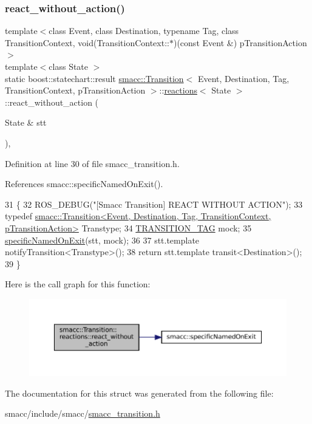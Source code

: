 \subsubsection{\texorpdfstring{react\+\_\+without\+\_\+action()}{react\_without\_action()}}
{\footnotesize\ttfamily template$<$class Event, class Destination, typename Tag, class Transition\+Context, void(\+Transition\+Context\+::$\ast$)(const Event \&) p\+Transition\+Action$>$ \\
template$<$class State $>$ \\
static boost\+::statechart\+::result \hyperlink{classsmacc_1_1Transition}{smacc\+::\+Transition}$<$ Event, Destination, Tag, Transition\+Context, p\+Transition\+Action $>$\+::\hyperlink{structsmacc_1_1Transition_1_1reactions}{reactions}$<$ State $>$\+::react\+\_\+without\+\_\+action (\begin{DoxyParamCaption}\item[{State \&}]{stt }\end{DoxyParamCaption})\hspace{0.3cm}{\ttfamily [inline]}, {\ttfamily [static]}}



Definition at line 30 of file smacc\+\_\+transition.\+h.



References smacc\+::specific\+Named\+On\+Exit().


\begin{DoxyCode}
31     \{
32       ROS\_DEBUG(\textcolor{stringliteral}{"[Smacc Transition] REACT WITHOUT ACTION"});
33       \textcolor{keyword}{typedef} 
      \hyperlink{classsmacc_1_1Transition}{smacc::Transition<Event, Destination, Tag, TransitionContext, pTransitionAction>}
       Transtype;
34       \hyperlink{classsmacc_1_1Transition_a672e883135344c4aea140381dd4d1c1d}{TRANSITION\_TAG} mock;
35       \hyperlink{namespacesmacc_afd94fcb8f8c410a0ced7954bf76e845d}{specificNamedOnExit}(stt, mock);
36 
37       stt.template notifyTransition<Transtype>();
38       \textcolor{keywordflow}{return} stt.template transit<Destination>();
39     \}
\end{DoxyCode}
Here is the call graph for this function\+:
\nopagebreak
\begin{figure}[H]
\begin{center}
\leavevmode
\includegraphics[width=350pt]{structsmacc_1_1Transition_1_1reactions_a96a69cf5b0cbd1e8fc49ca57efb37581_cgraph}
\end{center}
\end{figure}


The documentation for this struct was generated from the following file\+:\begin{DoxyCompactItemize}
\item 
smacc/include/smacc/\hyperlink{smacc__transition_8h}{smacc\+\_\+transition.\+h}\end{DoxyCompactItemize}
